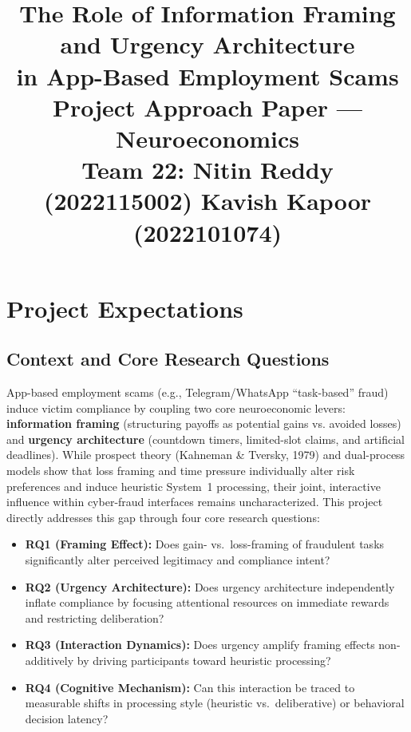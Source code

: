 \documentclass[11pt]{article}
\title{
    \vspace{-1.2cm}
    \textbf{\Large The Role of Information Framing and Urgency Architecture\\ in App-Based Employment Scams} \\[3pt]
    {\large Project Approach Paper --- Neuroeconomics} \\[4pt]
    {\normalsize Team 22: Nitin Reddy (2022115002) \quad Kavish Kapoor (2022101074)}
}
\date{}
\author{}
\begin{document}
\maketitle
\vspace{-1.6cm}

\section{Project Expectations}

\subsection{Context and Core Research Questions}
App-based employment scams (e.g., Telegram/WhatsApp ``task-based'' fraud) induce victim compliance by coupling two core neuroeconomic levers: \textbf{information framing} (structuring payoffs as potential gains vs. avoided losses) and \textbf{urgency architecture} (countdown timers, limited-slot claims, and artificial deadlines). While prospect theory (Kahneman \& Tversky, 1979) and dual-process models show that loss framing and time pressure individually alter risk preferences and induce heuristic System~1 processing, their joint, interactive influence within cyber-fraud interfaces remains uncharacterized. This project directly addresses this gap through four core research questions:
\begin{itemize}[leftmargin=*]
    \item \textbf{RQ1 (Framing Effect):} Does gain- vs.\ loss-framing of fraudulent tasks significantly alter perceived legitimacy and compliance intent?
    \item \textbf{RQ2 (Urgency Architecture):} Does urgency architecture independently inflate compliance by focusing attentional resources on immediate rewards and restricting deliberation?
    \item \textbf{RQ3 (Interaction Dynamics):} Does urgency amplify framing effects non-additively by driving participants toward heuristic processing?
    \item \textbf{RQ4 (Cognitive Mechanism):} Can this interaction be traced to measurable shifts in processing style (heuristic vs.\ deliberative) or behavioral decision latency?
\end{itemize}
\end{document}
